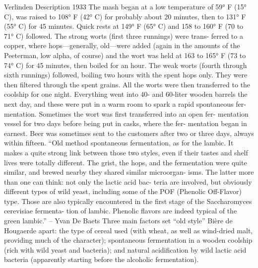 \documentclass[a4paper,parskip=half]{scrartcl}
\begin{document}
\parencite[46]{Hieronymus2010}
Verlinden Description
1933
The mash began at a low temperature of 59° F (15° C), was raised to
108° F (42° C) for probably about 20 minutes, then to 131° F (55° C)
for 45 minutes. Quick rests at 149° F (65° C) and 158 to 160° F (70
to 71° C) followed. The strong worts (first three runnings) were trans-
ferred to a copper, where hops—generally, old—were added (again in
the amounts of the Peeterman, low alpha, of course) and the wort was
held at 163 to 165° F (73 to 74° C) for 45 minutes, then boiled for
an hour. The weak worts (fourth through sixth runnings) followed,
boiling two hours with the spent hops only. They were then filtered
through the spent grains. All the worts were then transferred to the
coolship for one night.
Everything went into 40- and 60-liter wooden barrels the next day,
and these were put in a warm room to spark a rapid spontaneous fer-
mentation. Sometimes the wort was first transferred into an open fer-
mentation vessel for two days before being put in casks, where the fer-
mentation began in earnest.
Beer was sometimes sent to the customers after two or three days,
always within fifteen.
“Old method spontaneous fermentation, as for the lambic. It makes
a quite strong link between those two styles, even if their tastes and shelf
lives were totally different. The grist, the hops, and the fermentation
were quite similar, and brewed nearby they shared similar microorgan-
isms. The latter more than one can think: not only the lactic acid bac-
teria are involved, but obviously different types of wild yeast, including
some of the POF (Phenolic Off-Flavor) type. Those are also typically
encountered in the first stage of the Saccharomyces cerevisiae fermenta-
tion of lambic. Phenolic ﬂavors are indeed typical of the green lambic.”
– Yvan De Baets
Three main factors set “old style” Bière de Hougaerde apart: the type
of cereal used (with wheat, as well as wind-dried malt, providing much
of the character); spontaneous fermentation in a wooden coolship (rich
with wild yeast and bacteria); and natural acidification by wild lactic acid
bacteria (apparently starting before the alcoholic fermentation).
\end{document}
